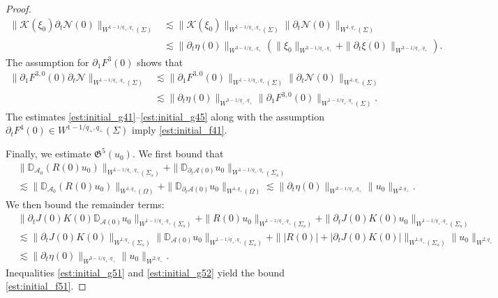 \documentclass[letterpaper,reqno,10pt,twoside]{amsart}
\theoremstyle{definition}
\theoremstyle{remark}
\def\p{\partial}
\def\Om{\Omega}
\begin{document}
\begin{appendix}
\begin{proof}
				\begin{equation}\label{est:initial_g44}
					\begin{aligned}
						\|\mathcal{K}(\xi_0)\p_t\mathcal{N}(0)\|_{W^{1-1/q_+, q_+}(\Sigma)}&\lesssim \|\mathcal{K}(\xi_0)\|_{W^{1-1/q_+, q_+}(\Sigma)}\|\p_t\mathcal{N}(0)\|_{W^{1, q_+}(\Sigma)}\\
						&\lesssim  \|\p_t\eta(0)\|_{W^{3-1/q_+,q_+}}(\|\xi_0\|_{W^{3-1/q_+,q_+}}+\|\p_t\xi(0)\|_{W^{3-1/q_+,q_+}}).
					\end{aligned}
				\end{equation}
				The assumption for $\p_1F^3(0)$ shows that
				\begin{equation}\label{est:initial_g45}
					\begin{aligned}
						\|\p_1F^{3,0}(0)\p_t\mathcal{N}\|_{W^{1-1/q_+, q_+}(\Sigma)}&\lesssim \|\p_1F^{3,0}(0)\|_{W^{1-1/q_+, q_+}(\Sigma)}\|\p_t\mathcal{N}(0)\|_{W^{1, q_+}(\Sigma)}\\
						&\lesssim  \|\p_t\eta(0)\|_{W^{3-1/q_+,q_+}}\|\p_1F^{3,0}(0)\|_{W^{1-1/q_+, q_+}(\Sigma)}.
					\end{aligned}
				\end{equation}
				The estimates \eqref{est:initial_g41}--\eqref{est:initial_g45} along with the assumption $\p_tF^4(0)\in W^{1-1/q_+, q_+}(\Sigma)$ imply \eqref{est:initial_f41}.
				
				Finally, we estimate $\mathfrak{G}^5(u_0)$. We first bound that
				\begin{equation}\label{est:initial_g51}
					\begin{aligned}
						&\|\mathbb{D}_{\mathcal{A}_0}(R(0)u_0)\|_{W^{1-1/q_+, q_+}(\Sigma_s)}+\|\mathbb{D}_{\p_t\mathcal{A}(0)}u_0\|_{W^{1-1/q_+, q_+}(\Sigma_s)}\\
						&\lesssim \|\mathbb{D}_{\mathcal{A}_0}(R(0)u_0)\|_{W^{1, q_+}(\Om)}+\|\mathbb{D}_{\p_t\mathcal{A}(0)}u_0\|_{W^{1, q_+}(\Om)}\lesssim \|\p_t\eta(0)\|_{W^{3-1/q_+,q_+}}\|u_0\|_{W^{2,q_+}}.
					\end{aligned}
				\end{equation}
				We then bound the remainder terms:
				\begin{equation}\label{est:initial_g52}
					\begin{aligned}
						&\|\p_tJ(0)K(0)\mathbb{D}_{\mathcal{A}(0)}u_0\|_{W^{1-1/q_+, q_+}(\Sigma_s)}+\|R(0)u_0\|_{W^{1-1/q_+, q_+}(\Sigma_s)}+\| \p_tJ(0)K(0)u_0\|_{W^{1-1/q_+, q_+}(\Sigma_s)}\\
						&\lesssim\|\p_tJ(0)K(0)\|_{W^{1, q_+}(\Sigma_s)}\|\mathbb{D}_{\mathcal{A}(0)}u_0\|_{W^{1-1/q_+, q_+}(\Sigma_s)}+\||R(0)|+|\p_tJ(0)K(0)|\|_{W^{1, q_+}(\Sigma_s)}\|u_0\|_{W^{2, q_+}}\\
						&\lesssim \|\p_t\eta(0)\|_{W^{3-1/q_+,q_+}}\|u_0\|_{W^{2, q_+}}.
					\end{aligned}
				\end{equation}
				Inequalities \eqref{est:initial_g51} and \eqref{est:initial_g52} yield the bound \eqref{est:initial_f51}.
			\end{proof}
			

\end{appendix}
\end{document}

